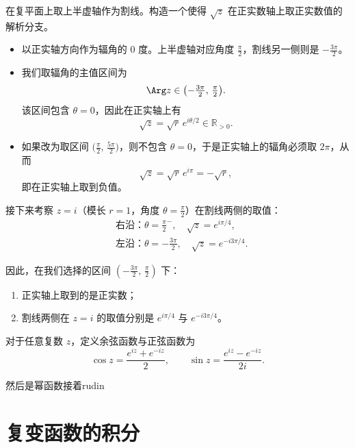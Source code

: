 \documentclass[lang=cn,10pt]{elegantbook}
\begin{document}
\begin{example}[平方根函数的解析分支]
在复平面上取上半虚轴作为割线。构造一个使得
$
\sqrt{z}
$
在正实数轴上取正实数值的解析分支。

\begin{itemize}
  \item 以正实轴方向作为辐角的 $0$ 度。上半虚轴对应角度 $\tfrac{\pi}{2}$，割线另一侧则是 $-\tfrac{3\pi}{2}$。
  \item 我们取辐角的主值区间为
  \[
  \Arg z \in \bigl(-\tfrac{3\pi}{2},\,\tfrac{\pi}{2}\bigr).
  \]
  该区间包含 $\theta=0$，因此在正实轴上有
  \[
  \sqrt{z} = \sqrt{r}\,e^{i\theta/2} \in \mathbb{R}_{>0}.
  \]

  \item 如果改为取区间 $\bigl(\tfrac{\pi}{2},\,\tfrac{5\pi}{2}\bigr)$，则不包含 $\theta=0$，于是正实轴上的辐角必须取 $2\pi$，从而
  \[
  \sqrt{z} = \sqrt{r}\,e^{i\pi} = -\sqrt{r},
  \]
  即在正实轴上取到负值。
\end{itemize}

接下来考察 $z=i$（模长 $r=1$，角度 $\theta=\tfrac{\pi}{2}$）在割线两侧的取值：
\begin{align*}
  &\text{右沿：} \theta = \tfrac{\pi}{2}^{-}, \quad \sqrt{z} = e^{i\pi/4}, \\
  &\text{左沿：} \theta = -\tfrac{3\pi}{2}, \quad \sqrt{z} = e^{-i3\pi/4}.
\end{align*}

因此，在我们选择的区间 $(-\tfrac{3\pi}{2},\,\tfrac{\pi}{2})$ 下：
\begin{enumerate}
  \item 正实轴上取到的是正实数；
  \item 割线两侧在 $z=i$ 的取值分别是 $e^{i\pi/4}$ 与 $e^{-i3\pi/4}$。
\end{enumerate}
\end{example}
\begin{definition}[复数的三角函数]
对于任意复数 $z$，定义余弦函数与正弦函数为
\[
\cos z = \frac{e^{iz} + e^{-iz}}{2}, 
\qquad 
\sin z = \frac{e^{iz} - e^{-iz}}{2i}. \tag{8.1}
\]
\end{definition}

然后是幂函数接着rudin
\chapter{复变函数的积分}
\end{document}
